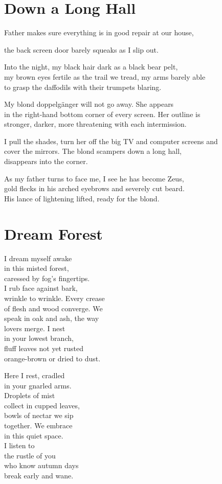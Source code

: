\documentclass[twoside,10pt]{book}
\begin{document}
\clearpage
\section{Down a Long Hall}

Father makes sure everything is in good repair at our house,

the back screen door barely squeaks as I slip out.

Into the night, my black hair dark as a black bear pelt,\\
my brown eyes fertile as the trail we tread, my arms barely able\\
to grasp the daffodils with their trumpets blaring.

My blond doppelgänger will not go away. She appears\\
in the right-hand bottom corner of every screen. Her outline is\\
stronger, darker, more threatening with each intermission.

I pull the shades, turn her off the big TV and computer screens and\\
cover the mirrors. The blond scampers down a long hall,\\
disappears into the corner.

As my father turns to face me, I see he has become Zeus,\\
gold flecks in his arched eyebrows and severely cut beard.\\
His lance of lightening lifted, ready for the blond.


\clearpage
\section{Dream Forest}

I dream myself awake\\
in this misted forest,\\
caressed by fog's fingertips.\\
I rub face against bark,\\
wrinkle to wrinkle. Every crease\\
of flesh and wood converge. We\\
speak in oak and ash, the way\\
lovers merge. I nest\\
in your lowest branch,\\
fluff leaves not yet rusted\\
orange-brown or dried to dust.

Here I rest, cradled\\
in your gnarled arms.\\
Droplets of mist\\
collect in cupped leaves,\\
bowls of nectar we sip\\
together. We embrace\\
in this quiet space.\\
I listen to\\
the rustle of you\\
who know autumn days\\
break early and wane.
\end{document}
